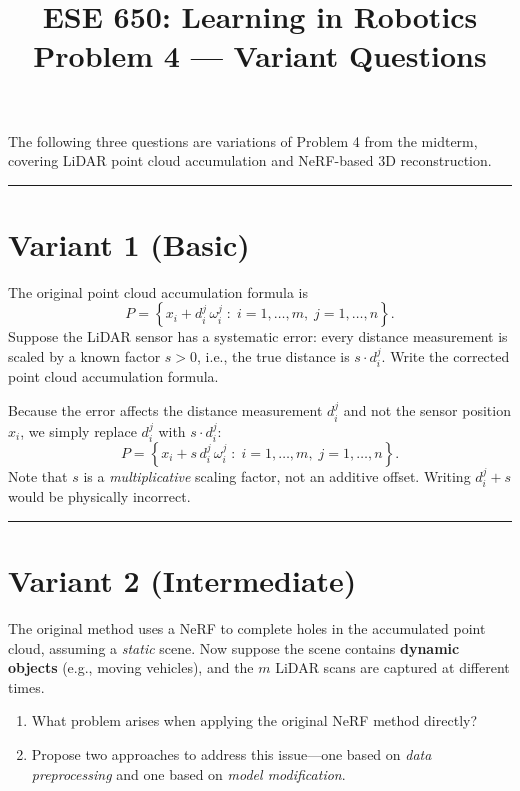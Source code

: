 \documentclass[12pt]{article}
\title{\textbf{ESE 650: Learning in Robotics}\\[0.5em]
Problem 4 --- Variant Questions}
\date{}
\begin{document}
\maketitle

\noindent
The following three questions are variations of Problem 4 from the midterm,
covering LiDAR point cloud accumulation and NeRF-based 3D reconstruction.

\bigskip
\hrule
\bigskip

\section*{Variant 1 (Basic)}

The original point cloud accumulation formula is
\[
    P = \left\{ x_i + d_i^j \,\omega_i^j \;:\; i = 1,\ldots,m,\; j = 1,\ldots,n \right\}.
\]
Suppose the LiDAR sensor has a systematic error: every distance measurement is
scaled by a known factor $s > 0$, i.e., the true distance is $s \cdot d_i^j$.
Write the corrected point cloud accumulation formula.

\begin{answerbox}
Because the error affects the distance measurement $d_i^j$ and not the sensor
position $x_i$, we simply replace $d_i^j$ with $s \cdot d_i^j$:
\[
    P = \left\{ x_i + s\, d_i^j \,\omega_i^j \;:\; i = 1,\ldots,m,\; j = 1,\ldots,n \right\}.
\]
Note that $s$ is a \emph{multiplicative} scaling factor, not an additive offset.
Writing $d_i^j + s$ would be physically incorrect.
\end{answerbox}

\bigskip
\hrule
\bigskip

\section*{Variant 2 (Intermediate)}

The original method uses a NeRF to complete holes in the accumulated point cloud,
assuming a \emph{static} scene. Now suppose the scene contains \textbf{dynamic
objects} (e.g., moving vehicles), and the $m$ LiDAR scans are captured at
different times.

\begin{enumerate}[label=(\alph*)]
    \item What problem arises when applying the original NeRF method directly?
    \item Propose two approaches to address this issue---one based on
          \emph{data preprocessing} and one based on \emph{model modification}.
\end{enumerate}
\end{document}
